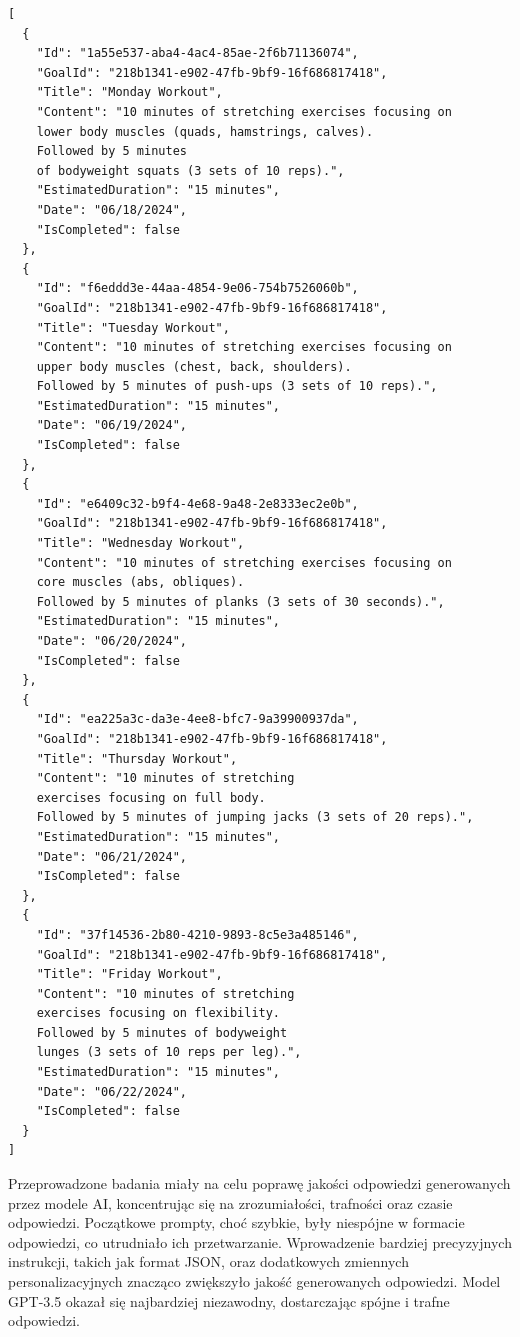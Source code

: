 \begin{lstlisting}[language=html, caption=Odpowiedź modelu AI na prompt, linewidth=150mm]
[
  {
    "Id": "1a55e537-aba4-4ac4-85ae-2f6b71136074",
    "GoalId": "218b1341-e902-47fb-9bf9-16f686817418",
    "Title": "Monday Workout",
    "Content": "10 minutes of stretching exercises focusing on 
    lower body muscles (quads, hamstrings, calves).
    Followed by 5 minutes 
    of bodyweight squats (3 sets of 10 reps).",
    "EstimatedDuration": "15 minutes",
    "Date": "06/18/2024",
    "IsCompleted": false
  },
  {
    "Id": "f6eddd3e-44aa-4854-9e06-754b7526060b",
    "GoalId": "218b1341-e902-47fb-9bf9-16f686817418",
    "Title": "Tuesday Workout",
    "Content": "10 minutes of stretching exercises focusing on 
    upper body muscles (chest, back, shoulders). 
    Followed by 5 minutes of push-ups (3 sets of 10 reps).",
    "EstimatedDuration": "15 minutes",
    "Date": "06/19/2024",
    "IsCompleted": false
  },
  {
    "Id": "e6409c32-b9f4-4e68-9a48-2e8333ec2e0b",
    "GoalId": "218b1341-e902-47fb-9bf9-16f686817418",
    "Title": "Wednesday Workout",
    "Content": "10 minutes of stretching exercises focusing on 
    core muscles (abs, obliques). 
    Followed by 5 minutes of planks (3 sets of 30 seconds).",
    "EstimatedDuration": "15 minutes",
    "Date": "06/20/2024",
    "IsCompleted": false
  },
  {
    "Id": "ea225a3c-da3e-4ee8-bfc7-9a39900937da",
    "GoalId": "218b1341-e902-47fb-9bf9-16f686817418",
    "Title": "Thursday Workout",
    "Content": "10 minutes of stretching
    exercises focusing on full body. 
    Followed by 5 minutes of jumping jacks (3 sets of 20 reps).",
    "EstimatedDuration": "15 minutes",
    "Date": "06/21/2024",
    "IsCompleted": false
  },
  {
    "Id": "37f14536-2b80-4210-9893-8c5e3a485146",
    "GoalId": "218b1341-e902-47fb-9bf9-16f686817418",
    "Title": "Friday Workout",
    "Content": "10 minutes of stretching
    exercises focusing on flexibility. 
    Followed by 5 minutes of bodyweight
    lunges (3 sets of 10 reps per leg).",
    "EstimatedDuration": "15 minutes",
    "Date": "06/22/2024",
    "IsCompleted": false
  }
]
\end{lstlisting}

Przeprowadzone badania miały na celu poprawę jakości odpowiedzi generowanych przez modele AI, koncentrując się na zrozumiałości, trafności oraz czasie odpowiedzi. Początkowe prompty, choć szybkie, były niespójne w formacie odpowiedzi, co utrudniało ich przetwarzanie. Wprowadzenie bardziej precyzyjnych instrukcji, takich jak format JSON, oraz dodatkowych zmiennych personalizacyjnych znacząco zwiększyło jakość generowanych odpowiedzi. Model GPT-3.5 okazał się najbardziej niezawodny, dostarczając spójne i trafne odpowiedzi.

